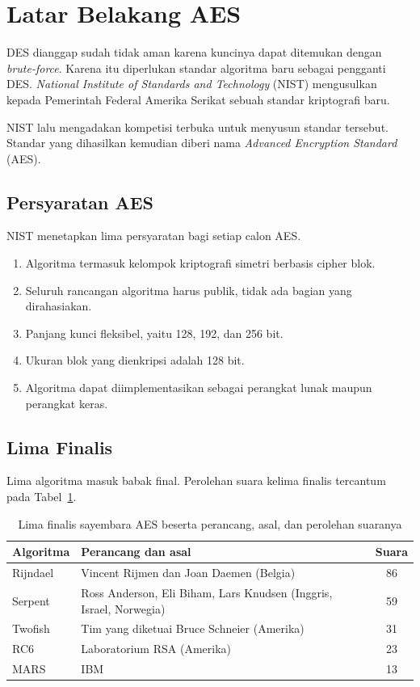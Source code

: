 \section{Latar Belakang AES}

DES dianggap sudah tidak aman karena kuncinya dapat ditemukan dengan
\textit{brute-force}. Karena itu diperlukan standar algoritma baru sebagai
pengganti DES. \textit{National Institute of Standards and Technology} (NIST)
mengusulkan kepada Pemerintah Federal Amerika Serikat sebuah standar kriptografi
baru.

NIST lalu mengadakan kompetisi terbuka untuk menyusun standar tersebut. Standar
yang dihasilkan kemudian diberi nama \textit{Advanced Encryption Standard} (AES).

\subsection{Persyaratan AES}

NIST menetapkan lima persyaratan bagi setiap calon AES.
\begin{enumerate}
    \item Algoritma termasuk kelompok kriptografi simetri berbasis cipher blok.
    \item Seluruh rancangan algoritma harus publik, tidak ada bagian yang
    dirahasiakan.
    \item Panjang kunci fleksibel, yaitu 128, 192, dan 256 bit.
    \item Ukuran blok yang dienkripsi adalah 128 bit.
    \item Algoritma dapat diimplementasikan sebagai perangkat lunak maupun
    perangkat keras.
\end{enumerate}

\subsection{Lima Finalis}

Lima algoritma masuk babak final. Perolehan suara kelima finalis tercantum pada
Tabel~\ref{tab:finalis-aes}.

\begin{table}[htbp]
\centering
\caption{Lima finalis sayembara AES beserta perancang, asal, dan perolehan suaranya}
\label{tab:finalis-aes}
\small
\begin{tabular}{@{}l l c@{}}
\hline
\textbf{Algoritma} & \textbf{Perancang dan asal} & \textbf{Suara} \\
\hline
Rijndael & Vincent Rijmen dan Joan Daemen (Belgia) & 86 \\
Serpent & Ross Anderson, Eli Biham, Lars Knudsen (Inggris, Israel, Norwegia) & 59 \\
Twofish & Tim yang diketuai Bruce Schneier (Amerika) & 31 \\
RC6 & Laboratorium RSA (Amerika) & 23 \\
MARS & IBM & 13 \\
\hline
\end{tabular}
\end{table}

